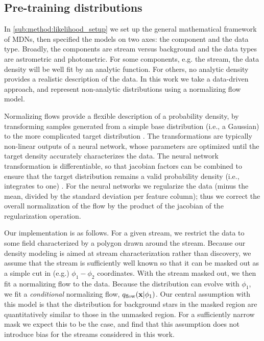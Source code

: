 \documentclass[twocolumn, linenumbers]{aastex631}
\begin{document}

    \subsection{Pre-training distributions} 
    \label{sub:method:pre-training_distributions}

        In \autoref{sub:method:likelihood_setup} we set up the general
        mathematical framework of MDNs, then specified the models on two axes:
        the component and the data type. Broadly, the components are stream
        versus background and the data types are astrometric and photometric.
        For some components, e.g. the stream, the data density will be well fit
        by an analytic function.  For others, no analytic density provides a
        realistic description of the data. In this work we take a data-driven
        approach, and represent non-analytic distributions using a normalizing
        flow model.

        Normalizing flows provide a flexible description of a probability
        density, by transforming samples generated from a simple base
        distribution (i.e., a Gaussian) to the more complicated target
        distribution \citep{EstebanVanden2010, Rippel2013, RezendeMohamed2015}.
        The transformations are typically non-linear outputs of a neural
        network, whose parameters are optimized until the target density
        accurately characterizes the data. The neural network transformation is
        differentiable, so that jacobian factors can be combined to ensure that
        the target distribution remains a valid probability density (i.e.,
        integrates to one) \citep{Kobyzev+2019}.  For the neural networks we
        regularize the data (minus the mean, divided by the standard deviation
        per feature column); thus we correct the overall normalization of the
        flow by the product of the jacobian of the regularization operation.

        Our implementation is as follows. For a given stream, we restrict the
        data to some field characterized by a polygon drawn around the stream.
        Because our density modeling is aimed at stream characterization rather
        than discovery, we assume that the stream is sufficiently well known so
        that it can be masked out as a simple cut in (e.g.) $\phi_1-\phi_2$
        coordinates. With the stream masked out, we then fit a normalizing flow
        to the data. Because the distribution can evolve with $\phi_1$, we fit a
        \emph{conditional} normalizing flow, $q_{\rm flow}(\mathbf{x}|\phi_1)$.
        Our central assumption with this model is that the distribution for
        background stars in the masked region are quantitatively similar to
        those in the unmasked region. For a sufficiently narrow mask we expect
        this to be the case, and find that this assumption does not introduce
        bias for the streams considered in this work.
\end{document}
